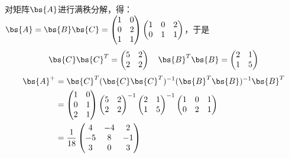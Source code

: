 \documentclass[12pt, a4paper, oneside, UTF8]{ctexbook}
\begin{document}
\begin{solution}
    对矩阵$\bs{A}$进行满秩分解，得：
    $\bs{A}=\bs{B}\bs{C}=\begin{pmatrix}
        1 & 0\\
        0&2\\
        1&1
    \end{pmatrix}\begin{pmatrix}
        1&0&2\\
        0&1&1
    \end{pmatrix}$，于是
    \begin{align*}
        \bs{C}\bs{C}^T=\begin{pmatrix}
            5&2\\
            2&2
        \end{pmatrix} \quad \bs{B}^T\bs{B}=\begin{pmatrix}
            2&1\\
            1&5
        \end{pmatrix}
    \end{align*}
    \begin{align*}
        \bs{A}^+&=
    \bs{C}^T(\bs{C}\bs{C}^T)^{-1}(\bs{B}^T\bs{B})^{-1}\bs{B}^T\\
    &=\begin{pmatrix}
        1&0\\
        0&1\\
        2&1
    \end{pmatrix}\begin{pmatrix}
        5&2\\
        2&2
    \end{pmatrix}^{-1}\begin{pmatrix}
        2&1\\
        1&5
    \end{pmatrix}^{-1}
    \begin{pmatrix}
        1&0&1\\
        0&2&1
    \end{pmatrix}\\
    &=\frac{1}{18}\begin{pmatrix}
       4&-4&2\\
       -5&8&-1\\
       3&0&3 
    \end{pmatrix}
    \end{align*}


\end{solution}
\end{document}
